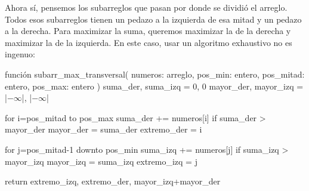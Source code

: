 Ahora sí, pensemos los subarreglos que pasan por donde se dividió el arreglo. Todos esos subarreglos tienen un pedazo a la izquierda de esa mitad y un pedazo a la derecha. Para maximizar la suma, queremos maximizar la de la derecha y maximizar la de la izquierda. En este caso, usar un algoritmo exhaustivo no es ingenuo:
\begin{pseudocode}
función subarr_max_transversal(
    numeros: arreglo,
    pos_min: entero,
    pos_mitad: entero,
    pos_max: entero
)
    suma_der, suma_izq = 0, 0
    mayor_der, mayor_izq = |$-\infty$|, |$-\infty$|

    for i=pos_mitad to pos_max
        suma_der += numeros[i]
        if suma_der > mayor_der
            mayor_der = suma_der
            extremo_der = i

    for j=pos_mitad-1 downto pos_min
        suma_izq += numeros[j]
        if suma_izq > mayor_izq
            mayor_izq = suma_izq
            extremo_izq = j

    return extremo_izq, extremo_der, mayor_izq+mayor_der
\end{pseudocode}


